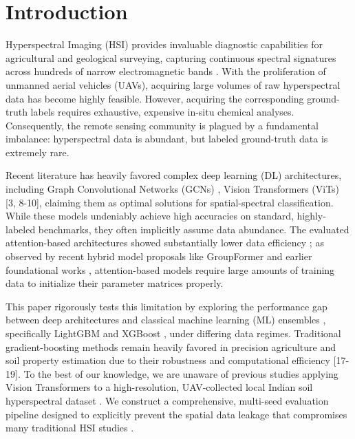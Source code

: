 \documentclass[pdflatex,sn-mathphys-num,iicol]{sn-jnl}
\begin{document}

\maketitle

\section{Introduction}\label{sec1}
Hyperspectral Imaging (HSI) provides invaluable diagnostic capabilities for agricultural and geological surveying, capturing continuous spectral signatures across hundreds of narrow electromagnetic bands \cite{b1}. With the proliferation of unmanned aerial vehicles (UAVs), acquiring large volumes of raw hyperspectral data has become highly feasible. However, acquiring the corresponding ground-truth labels requires exhaustive, expensive in-situ chemical analyses. Consequently, the remote sensing community is plagued by a fundamental imbalance: hyperspectral data is abundant, but labeled ground-truth data is extremely rare.

Recent literature has heavily favored complex deep learning (DL) architectures, including Graph Convolutional Networks (GCNs) \cite{b2}, Vision Transformers (ViTs) [3, 8-10], claiming them as optimal solutions for spatial-spectral classification. While these models undeniably achieve high accuracies on standard, highly-labeled benchmarks, they often implicitly assume data abundance. The evaluated attention-based architectures showed substantially lower data efficiency \cite{b24}; as observed by recent hybrid model proposals like GroupFormer \cite{b5} and earlier foundational works \cite{b6, b23}, attention-based models require large amounts of training data to initialize their parameter matrices properly.

This paper rigorously tests this limitation by exploring the performance gap between deep architectures and classical machine learning (ML) ensembles \cite{b32, b33}, specifically LightGBM \cite{b27} and XGBoost \cite{b26}, under differing data regimes. Traditional gradient-boosting methods remain heavily favored in precision agriculture and soil property estimation due to their robustness and computational efficiency [17-19]. To the best of our knowledge, we are unaware of previous studies applying Vision Transformers to a high-resolution, UAV-collected local Indian soil hyperspectral dataset \cite{b20}. We construct a comprehensive, multi-seed evaluation pipeline designed to explicitly prevent the spatial data leakage that compromises many traditional HSI studies \cite{b34}.
\end{document}
